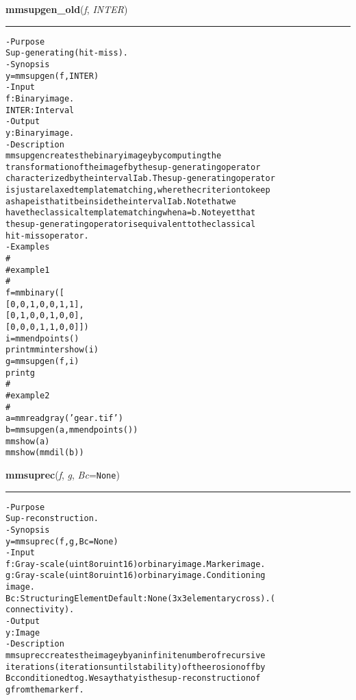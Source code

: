     \begin{boxedminipage}{\textwidth}

    \raggedright \textbf{mmsupgen\_old}(\textit{f}, \textit{INTER})

    \vspace{-1.5ex}

    \rule{\textwidth}{0.5\fboxrule}
\begin{alltt}
- Purpose
    Sup-generating (hit-miss).
- Synopsis
    y = mmsupgen(f, INTER)
- Input
    f:     Binary image.
    INTER: Interval
- Output
    y: Binary image.
- Description
    mmsupgen creates the binary image y by computing the
    transformation of the image f by the sup-generating operator
    characterized by the interval Iab . The sup-generating operator
    is just a relaxed template matching, where the criterion to keep
    a shape is that it be inside the interval Iab . Note that we
    have the classical template matching when a=b . Note yet that
    the sup-generating operator is equivalent to the classical
    hit-miss operator.
- Examples
    \#
    \#   example 1
    \#
    f=mmbinary([
       [0,0,1,0,0,1,1],
       [0,1,0,0,1,0,0],
       [0,0,0,1,1,0,0]])
    i=mmendpoints()
    print mmintershow(i)
    g=mmsupgen(f,i)
    print g
    \#
    \#   example 2
    \#
    a=mmreadgray('gear.tif')
    b=mmsupgen(a,mmendpoints())
    mmshow(a)
    mmshow(mmdil(b))\end{alltt}

    \vspace{1ex}

    \end{boxedminipage}

    \label{multireg:num_pymorph:mmsuprec}
    \vspace{0.5ex}

    \begin{boxedminipage}{\textwidth}

    \raggedright \textbf{mmsuprec}(\textit{f}, \textit{g}, \textit{Bc}=\texttt{N\-o\-n\-e\-})

    \vspace{-1.5ex}

    \rule{\textwidth}{0.5\fboxrule}
\begin{alltt}
- Purpose
    Sup-reconstruction.
- Synopsis
    y = mmsuprec(f, g, Bc=None)
- Input
    f:  Gray-scale (uint8 or uint16) or binary image. Marker image.
    g:  Gray-scale (uint8 or uint16) or binary image. Conditioning
        image.
    Bc: Structuring Element Default: None (3x3 elementary cross). (
        connectivity).
- Output
    y: Image
- Description
    mmsuprec creates the image y by an infinite number of recursive
    iterations (iterations until stability) of the erosion of f by
    Bc conditioned to g . We say that y is the sup-reconstruction of
    g from the marker f .\end{alltt}

    \vspace{1ex}

    \end{boxedminipage}

